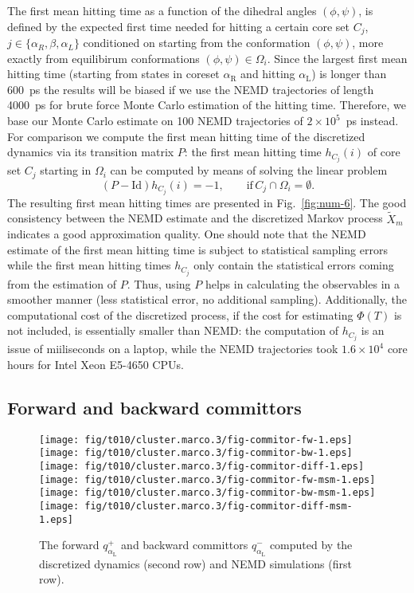 \documentclass[aps, pre, preprint,unsortedaddress,a4paper,onecolumn]{revtex4}
\newcommand{\vect}[1]{#1}
\newcommand{\fwd}[0]{+}
\newcommand{\bwd}[0]{-}
\newcommand{\id}{\mathrm{Id}}
\newcommand{\confaa}[0]{{\alpha_{\textrm{R}}}}
\newcommand{\confc}[0]{{\alpha_{\textrm{L}}}}
\begin{document}
The first mean hitting time as a function of the dihedral angles $(\phi,\psi)$,
is defined by the expected first time needed for hitting a certain core set $C_j$,
$j\in\{\alpha_R,\beta,\alpha_L\}$ conditioned on starting from the
conformation $(\phi,\psi)$, more exactly from equilibirum conformations $(\phi,\psi)\in\Omega_i$.  Since the largest first mean hitting
time (starting from states in coreset $\confaa$ and hitting $\confc$) is longer than
600~ps the results will be biased if we use the NEMD trajectories of length 4000~ps for brute force Monte Carlo estimation of the hitting time. 
Therefore, we base our Monte Carlo estimate on 100 NEMD
trajectories of $2\times 10^5$~ps instead. For comparison we compute the first mean hitting
time of the discretized dynamics via its transition matrix $\vect P$: the first mean hitting time $h_{C_j}(i)$ of core set $C_j$ starting in $\Omega_i$ can  be computed by means of solving the linear problem \cite{A19-31}
\[
(\vect P-\id) h_{C_j}(i) = -1,\qquad \mathrm{if} \, C_j\cap \Omega_i=\emptyset.
\] 
The resulting first mean hitting times are presented in Fig.~\ref{fig:num-6}.  The
good consistency between the NEMD estimate and the discretized Markov process
$\tilde X_{m}$ indicates a good approximation quality.
One should note that the NEMD estimate of the first mean hitting time is subject to statistical sampling errors while the first mean hitting times $h_{C_j}$ only contain the statistical errors coming from the estimation of $\vect P$. 
Thus, using $P$ helps in calculating the observables
in a smoother  manner (less statistical error, no additional sampling).
Additionally, the computational cost of the
discretized process, if the cost for estimating $\Phi(T)$ is not included, is
essentially smaller than NEMD:
the computation of $h_{C_j}$ is an issue of miiliseconds on a laptop, while the
NEMD trajectories took $1.6\times 10^4$ core hours for Intel Xeon E5-4650 CPUs.


\subsection{Forward and backward committors}
\label{sec:alanine-committor}
\begin{figure}
  \centering
  \texttt{[image: fig/t010/cluster.marco.3/fig-commitor-fw-1.eps]}
  \texttt{[image: fig/t010/cluster.marco.3/fig-commitor-bw-1.eps]}
  \texttt{[image: fig/t010/cluster.marco.3/fig-commitor-diff-1.eps]}\\
  \texttt{[image: fig/t010/cluster.marco.3/fig-commitor-fw-msm-1.eps]}
  \texttt{[image: fig/t010/cluster.marco.3/fig-commitor-bw-msm-1.eps]}
  \texttt{[image: fig/t010/cluster.marco.3/fig-commitor-diff-msm-1.eps]}
  \caption{The forward $q^\fwd_{\confc}$ and backward committors
    $q^\bwd_{\confc}$ computed by the discretized dynamics (second row) and NEMD simulations (first
    row).}
  \label{fig:num-3}
\end{figure}
\end{document}
